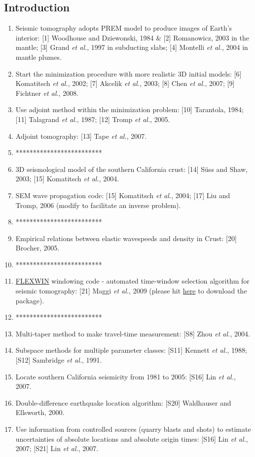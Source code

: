 \documentclass{article}
\newcommand{\sline}{*************************}
\newcommand{\myem}[1]{{\color{red}\uline{#1}}}
\newcommand{\etal}{\textit{et al.}}
\begin{document}
\subsection{Introduction}
\begin{enumerate}[\hspace{10mm}*]
  \item Seismic tomography adopts PREM model to produce images of Earth's interior: [1] Woodhouse and Dziewonski, 1984 \& [2] Romanowicz, 2003 in the mantle; [3] Grand \etal, 1997 in subducting slabs; [4] Montelli \etal, 2004 in mantle plumes.
	\item Start the minimization procedure with more realistic 3D initial models: [6] Komatitsch \etal, 2002; [7] Akcelik \etal, 2003; [8] Chen \etal, 2007; [9] Fichtner \etal, 2008.
	\item Use adjoint method within the minimization problem: [10] Tarantola, 1984; [11] Talagrand \etal, 1987; [12] Tromp \etal, 2005.
	\item Adjoint tomography: [13] Tape \etal, 2007.
	\item \sline
	\item 3D seismological model of the southern California crust: [14] S\"{u}ss and Shaw, 2003; [15] Komatitsch \etal, 2004.
	\item SEM wave propagation code: [15] Komatitsch \etal, 2004; [17] Liu and Tromp, 2006 (modify to facilitate an inverse problem).
	\item \sline
	\item Empirical relations between elastic wavespeeds and density in Crust: [20] Brocher, 2005.
	\item \sline
    \item \myem{FLEXWIN} windowing code - automated time-window selection algorithm for seismic tomography: [21] Maggi \etal, 2009 (please hit \href{http://geodynamics.org/cig/software/flexwin/}{here} to download the package).
	\item \sline
    \item Multi-taper method to make travel-time measurement: [S8] Zhou \etal, 2004.
    \item Subspace methods for multiple parameter classes: [S11] Kennett \etal, 1988; [S12] Sambridge \etal, 1991.
    \item Locate southern California seismicity from 1981 to 2005: [S16] Lin \etal, 2007.
    \item Double-difference earthquake location algorithm: [S20] Waldhauser and Ellsworth, 2000.
    \item Use information from controlled sources (quarry blasts and shots) to estimate uncertainties of absolute locations and absolute origin times: [S16] Lin \etal, 2007; [S21] Lin \etal, 2007.

\end{enumerate}
\end{document}
